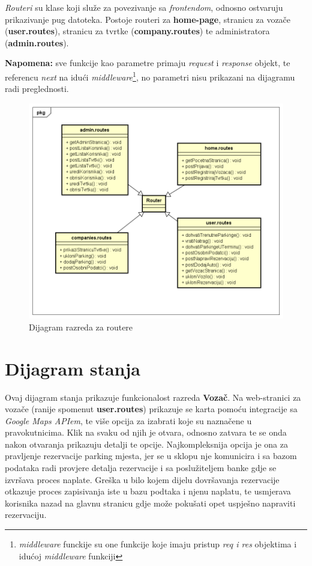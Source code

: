 			\textit{Routeri} su klase koji služe za povezivanje sa \textit{frontendom}, odnosno ostvaruju prikazivanje pug datoteka. Postoje routeri za \textbf{home-page}, stranicu za vozače (\textbf{user.routes}), stranicu za tvrtke (\textbf{company.routes}) te administratora (\textbf{admin.routes}).
			
			\textbf{Napomena:} sve funkcije kao parametre primaju \textit{request} i \textit{response} objekt, te referencu \textit{next} na idući \textit{middleware}\footnote{\textit{middleware} funckije su one funkcije koje imaju pristup \textit{req i res} objektima i idućoj \textit{middleware} funkciji}, no parametri nisu prikazani na dijagramu radi preglednosti.
			
			\begin{figure}[H]
				\includegraphics[scale=0.55]{dijagrami/ruteri.png} %
				\centering
				\caption{Dijagram razreda za routere}
				\label{fig:promjene}
			\end{figure}
												
			\eject
		
		\section{Dijagram stanja}
			
			Ovaj dijagram stanja prikazuje funkcionalost razreda \textbf{Vozač}. Na web-stranici za vozače (ranije spomenut \textbf{user.routes}) prikazuje se karta pomoću integracije sa \textit{Google Maps APIem}, te više opcija za izabrati koje su naznačene u pravokutnicima. Klik na svaku od njih je otvara, odnosno zatvara te se onda nakon otvaranja prikazuju detalji te opcije. Najkompleksnija opcija je ona za pravljenje rezervacije parking mjesta, jer se u sklopu nje komunicira i sa bazom podataka radi provjere detalja rezervacije i sa poslužiteljem banke gdje se izvršava proces naplate. Greška u bilo kojem dijelu dovršavanja rezervacije otkazuje proces zapisivanja iste u bazu podtaka i njenu naplatu, te usmjerava korisnika nazad na glavnu stranicu gdje može pokušati opet uspješno napraviti rezervaciju.
			
